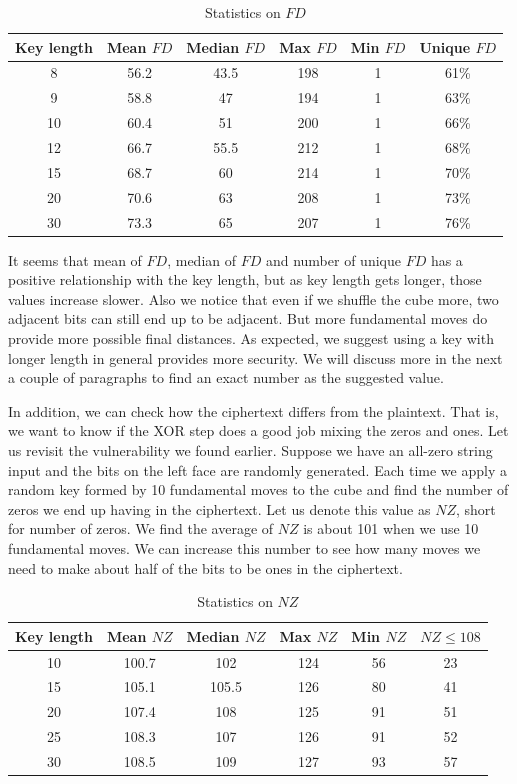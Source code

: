 \begin{table}[ht]
    \centering
    \begin{tabular}{|c|c|c|c|c|c|}
        \hline Key length & Mean $FD$ & Median $FD$ & Max $FD$ & Min $FD$ & Unique $FD$ \\
        \hline 8 & 56.2 & 43.5 & 198 & 1 & 61\% \\
        \hline 9 & 58.8 & 47 & 194 & 1 & 63\% \\
        \hline 10 & 60.4 & 51 & 200 & 1 & 66\% \\
        \hline 12 & 66.7 & 55.5 & 212 & 1 & 68\% \\
        \hline 15 & 68.7 & 60 & 214 & 1 & 70\% \\
        \hline 20 & 70.6 & 63 & 208 & 1 & 73\% \\
        \hline 30 & 73.3 & 65 & 207 & 1 & 76\% \\ \hline
    \end{tabular}
    \caption{Statistics on $FD$}
    \label{tab:bits-location}
\end{table}
It seems that mean of $FD$, median of $FD$ and number of unique $FD$ has a positive relationship with the key length, but as key length gets longer, those values increase slower. Also we notice that even if we shuffle the cube more, two adjacent bits can still end up to be adjacent. But more fundamental moves do provide more possible final distances. As expected, we suggest using a key with longer length in general provides more security. We will discuss more in the next a couple of paragraphs to find an exact number as the suggested value.
\par In addition, we can check how the ciphertext differs from the plaintext. That is, we want to know if the XOR step does a good job mixing the zeros and ones. Let us revisit the vulnerability we found earlier. Suppose we have an all-zero string input and the bits on the left face are randomly generated. Each time we apply a random key formed by 10 fundamental moves to the cube and find the number of zeros we end up having in the ciphertext. Let us denote this value as $NZ$, short for number of zeros. We find the average of $NZ$ is about 101 when we use 10 fundamental moves. We can increase this number to see how many moves we need to make about half of the bits to be ones in the ciphertext.
\begin{table}[ht]
    \centering
    \begin{tabular}{|c|c|c|c|c|c|}
        \hline Key length & Mean $NZ$ & Median $NZ$ & Max $NZ$ & Min $NZ$ & $NZ \leq 108$ \\
        \hline 10 & 100.7 & 102 & 124 & 56 & 23 \\
        \hline 15 & 105.1 & 105.5 & 126 & 80 & 41 \\
        \hline 20 & 107.4 & 108 & 125 & 91 & 51 \\
        \hline 25 & 108.3 & 107 & 126 & 91 & 52 \\
        \hline 30 & 108.5 & 109 & 127 & 93 & 57 \\ \hline
    \end{tabular}
    \caption{Statistics on $NZ$}
    \label{tab:number-zeros}
\end{table}
